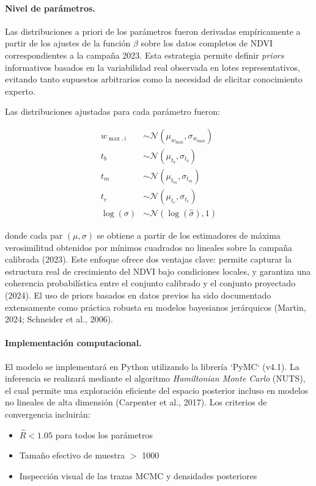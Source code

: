\documentclass[
11pt, %
]{charter}
\begin{document}
\paragraph{Nivel de parámetros.} Las distribuciones a priori de los parámetros fueron derivadas empíricamente a partir de los ajustes de la función $\beta$ sobre los datos completos de NDVI correspondientes a la campaña 2023. Esta estrategia permite definir \emph{priors} informativos basados en la variabilidad real observada en lotes representativos, evitando tanto supuestos arbitrarios como la necesidad de elicitar conocimiento experto.

Las distribuciones ajustadas para cada parámetro fueron:

\begin{align*}
w_{\max,i} &\sim \mathcal{N}(\mu_{w_{\max}}, \sigma_{w_{\max}}) \\
t_b &\sim \mathcal{N}(\mu_{t_b}, \sigma_{t_b}) \\
t_m &\sim \mathcal{N}(\mu_{t_m}, \sigma_{t_m}) \\
t_e &\sim \mathcal{N}(\mu_{t_e}, \sigma_{t_e}) \\
\log(\sigma) &\sim \mathcal{N}(\log(\hat{\sigma}), 1)
\end{align*}

\noindent
donde cada par $(\mu, \sigma)$ se obtiene a partir de los estimadores de máxima verosimilitud obtenidos por mínimos cuadrados no lineales sobre la campaña calibrada (2023). Este enfoque ofrece dos ventajas clave: permite capturar la estructura real de crecimiento del NDVI bajo condiciones locales, y garantiza una coherencia probabilística entre el conjunto calibrado y el conjunto proyectado (2024). El uso de priors basados en datos previos ha sido documentado extensamente como práctica robusta en modelos bayesianos jerárquicos (Martin, 2024; Schneider et al., 2006).



\paragraph{Implementación computacional.} El modelo se implementará en Python utilizando la librería `PyMC` (v4.1). La inferencia se realizará mediante el algoritmo \textit{Hamiltonian Monte Carlo} (NUTS), el cual permite una exploración eficiente del espacio posterior incluso en modelos no lineales de alta dimensión (Carpenter et al., 2017). Los criterios de convergencia incluirán:

\begin{itemize}
    \item \(\hat{R} < 1.05\) para todos los parámetros
    \item Tamaño efectivo de muestra $>$ 1000
    \item Inspección visual de las trazas MCMC y densidades posteriores
\end{itemize}
\end{document}
